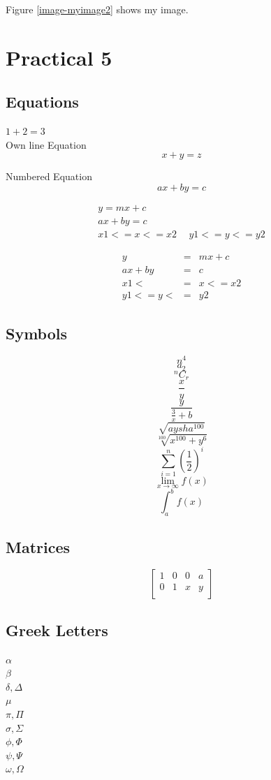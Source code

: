 \documentclass[a4paper,12pt]{article}
\begin{document}
{Figure \ref{image-myimage2} shows my image.

\section{Practical 5}
\subsection{Equations}
$1+2=3$\\
Own line Equation
$$x+y=z$$

Numbered Equation
\begin{equation} %
ax+by=c
\end{equation}

\begin{eqnarray}
y=mx+c\\
ax+by=c\\
x1<=x<=x2 \hspace{15pt}y1<=y<=y2
\end{eqnarray}

\begin{eqnarray*}
y & = & mx+c\\
ax+by & = & c\\
x1< & = & x<=x2\\
 y1<=y< & = & y2
\end{eqnarray*}

\subsection{Symbols}
$$n^4$$
$$a_2$$
$$^nC_r$$
$$\frac{x}{y}$$
$$\frac{y}{\frac{3}{x}+b}$$
$$\sqrt{aysha^{100}}$$
$$\sqrt[100]{x^{100}+y^6}$$
$$\sum_{i=1}^n ({\frac{1}{2}})^i$$
$$\lim_{x \to \infty} f(x)$$
$$\int_a^b f(x)$$

\subsection{Matrices}
\begin{equation*}
\left[
\begin{matrix}
1 &  0 & 0 & a\\
0 & 1 & x & y\\
\end{matrix}
\right]
\end{equation*}

\subsection{Greek Letters}
$\alpha$\\
$\beta$\\
$\delta, \Delta$\\
$\mu$\\
$\pi, \Pi$\\
$\sigma, \Sigma$\\
$\phi, \Phi$\\
$\psi, \Psi$\\
$\omega, \Omega$\\

}
\end{document}
